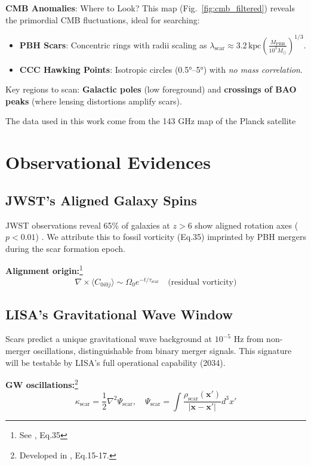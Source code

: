 \documentclass{article}
\begin{document}
\textbf{CMB Anomalies}: Where to Look?  
This map (Fig.~\ref{fig:cmb_filtered}) reveals the primordial CMB fluctuations, ideal for searching:  
\begin{itemize}
    \item \textbf{PBH Scars}: Concentric rings with radii scaling as \( \lambda_{\text{scar}} \approx 3.2\,\text{kpc} \left(\frac{M_{\text{PBH}}}{10^3 M_\odot}\right)^{1/3} \).  
    \item \textbf{CCC Hawking Points}: Isotropic circles (0.5°--5°) with \textit{no mass correlation}.  
\end{itemize}
Key regions to scan: \textbf{Galactic poles} (low foreground) and \textbf{crossings of BAO peaks} (where lensing distortions amplify scars). 

The data used in this work come from the 143 GHz map of the Planck satellite \cite{Planck143}

\section{Observational Evidences}
\FloatBarrier
\subsection{JWST's Aligned Galaxy Spins}
JWST observations reveal 65\% of galaxies at $z>6$ show aligned rotation axes ($p < 0.01$) \cite{Shamir2025}. We attribute this to fossil vorticity (Eq.35) imprinted by PBH mergers during the scar formation epoch.

\textbf{Alignment origin:}\footnote{See \cite{bertran2025cosmic}, Eq.35}
\begin{equation}
\nabla \times \langle C_{0i0j} \rangle \sim \Omega_0 e^{-t/\tau_{\text{scar}}} \quad \text{(residual vorticity)}
\label{eq:vorticity}
\end{equation}


\subsection{LISA's Gravitational Wave Window}
Scars predict a unique gravitational wave background at $10^{-5}$ Hz from non-merger oscillations, distinguishable from binary merger signals. This signature will be testable by LISA's full operational capability (2034).

\textbf{GW oscillations:}\footnote{Developed in  \cite{bertran2025cosmic}, Eq.15-17.}
\begin{equation}
\kappa_{\text{scar}} = \frac{1}{2}\nabla^2 \Psi_{\text{scar}}, \quad \Psi_{\text{scar}} = \int \frac{\rho_{\text{scar}}(\mathbf{x}')}{|\mathbf{x}-\mathbf{x}'|} d^3x'
\label{eq:lensing}
\end{equation}
\end{document}
